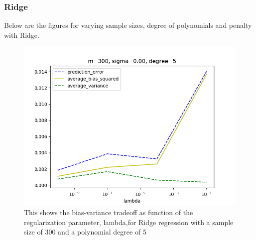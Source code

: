 \medskip

\subsubsection{Ridge}

Below are the figures for varying sample sizes, degree of polynomials and penalty with Ridge.

\FloatBarrier
\begin{figure}[!ht]
	\centering
	\FloatBarrier
	\includegraphics[width=1\textwidth]{plot_ridge_without_r2/ridgeprediction_error_m300_d5_s0.png}
	
	\caption{This shows the bias-variance tradeoff as function of the regularization parameter, lambda,for Ridge regression with a sample size of 300 and a polynomial degree of 5}
	\label{fig:2}
\end{figure}
\FloatBarrier

\medskip


